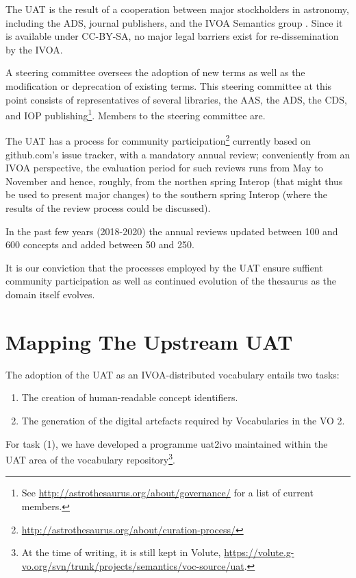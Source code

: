 \documentclass[11pt,a4paper]{ivoa}
\begin{document}
The UAT is the result of a cooperation between major stockholders in
astronomy, including the ADS, journal publishers, and the IVOA Semantics
group \citep{2014ASPC..485..461A}.  Since it is available under CC-BY-SA, 
no major legal barriers exist for re-dissemination by the IVOA.

A steering committee oversees the adoption of new terms as well as the
modification or deprecation of existing terms.  This steering committee
at this point consists of representatives of several libraries, the AAS,
the ADS, the CDS, and IOP publishing\footnote{See
\url{http://astrothesaurus.org/about/governance/} for a list of current
members.}.  Members to the steering committee are.

The UAT has a process for community
participation\footnote{\url{http://astrothesaurus.org/about/curation-process/}}
currently based on github.com's issue tracker, with a mandatory annual
review; conveniently from an IVOA perspective, the evaluation period for
such reviews runs from May to November and hence, roughly, from the
northen spring Interop (that might thus be used to present major
changes) to the southern spring Interop (where the results of the review
process could be discussed).

In the past few years (2018-2020) the annual reviews updated between 100
and 600 concepts and added between 50 and 250.

It is our conviction that the processes employed by the UAT ensure
suffient community participation as well as continued evolution of the
thesaurus as the domain itself evolves.

\section{Mapping The Upstream UAT}

The adoption of the UAT as an IVOA-distributed vocabulary entails two
tasks:

\begin{enumerate}
\item The creation of human-readable concept identifiers.
\item The generation of the digital artefacts required by Vocabularies
in the VO 2.
\end{enumerate}

For task (1), we have developed a programme uat2ivo maintained within
the UAT area of the vocabulary repository\footnote{At the time of
writing, it is still kept in Volute,
\url{https://volute.g-vo.org/svn/trunk/projects/semantics/voc-source/uat}.}.
\end{document}
